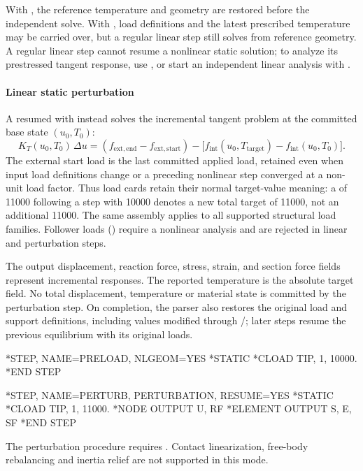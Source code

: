 With , the reference temperature and geometry are restored
before the independent solve. With , load definitions and
the latest prescribed temperature may be carried over, but a regular
linear step still solves from reference geometry. A regular linear
step cannot resume a nonlinear static solution; to analyze its
prestressed tangent response, use , or start an
independent linear analysis with .

\paragraph*{Linear static perturbation}

A resumed  with  instead solves the
incremental tangent problem at the committed base state \((u_0,T_0)\):
\[
K_T(u_0,T_0)\,\Delta u =
 (f_{\mathrm{ext,end}}-f_{\mathrm{ext,start}})
 - \bigl[f_{\mathrm{int}}(u_0,T_{\mathrm{target}})
         -f_{\mathrm{int}}(u_0,T_0)\bigr].
\]
The external start load is the last committed applied load, retained
even when input load definitions change or a preceding nonlinear step
converged at a non-unit load factor. Thus load cards retain their
normal target-value meaning:
a  of 11000 following a step with 10000 denotes a new total target
of 11000, not an additional 11000. The same assembly applies to all supported
structural load families. Follower loads () require a
nonlinear analysis and are rejected in linear and perturbation steps.

The output displacement, reaction force, stress, strain, and section force
fields represent incremental responses. The reported temperature is the
absolute target field. No total displacement, temperature or material
state is committed by the perturbation step. On completion, the parser also
restores the original load and support definitions, including values modified
through /; later steps resume the previous equilibrium
with its original loads.

\begin{inputdeck}
*STEP, NAME=PRELOAD, NLGEOM=YES
*STATIC
*CLOAD
TIP, 1, 10000.
*END STEP

*STEP, NAME=PERTURB, PERTURBATION, RESUME=YES
*STATIC
*CLOAD
TIP, 1, 11000.
*NODE OUTPUT
U, RF
*ELEMENT OUTPUT
S, E, SF
*END STEP
\end{inputdeck}

The perturbation procedure requires . Contact linearization,
free-body rebalancing and inertia relief are not supported in this mode.

